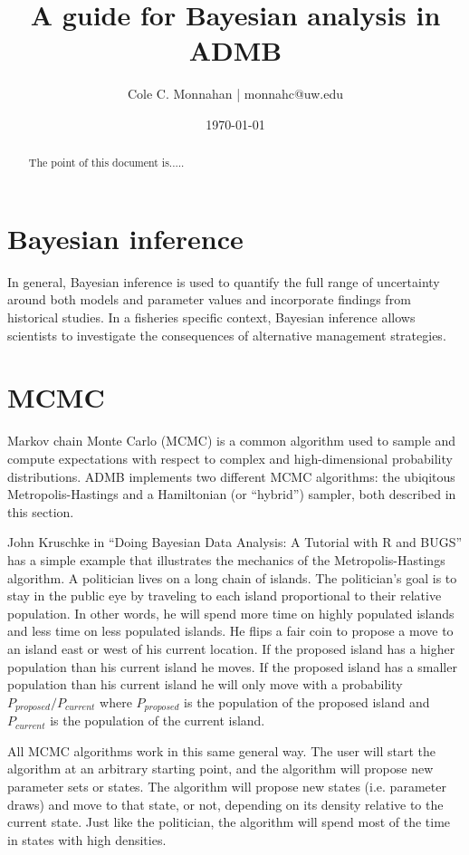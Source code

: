 \documentclass{article}\usepackage[]{graphicx}\usepackage[]{color}
\begin{document}
\title{A guide for Bayesian analysis in ADMB}
\author{Cole C. Monnahan | monnahc@uw.edu}
\date{\today{}}
\maketitle
\begin{abstract}
  The point of this document is.....
\end{abstract}

\tableofcontents

\section{Bayesian inference}
In general, Bayesian inference is used to quantify the full
range of uncertainty around both models and parameter values
and incorporate findings from historical studies. In a
fisheries specific context, Bayesian inference allows
scientists to investigate the consequences of alternative
management strategies.

\section{MCMC}
Markov chain Monte Carlo (MCMC) is a common algorithm used
to sample and compute expectations with respect to complex
and high-dimensional probability distributions.  ADMB
implements two different MCMC algorithms: the ubiqitous
Metropolis-Hastings and a Hamiltonian (or ``hybrid'')
sampler, both described in this section.

John Kruschke in ``Doing Bayesian Data Analysis: A Tutorial
with R and BUGS'' has a simple example that illustrates the
mechanics of the Metropolis-Hastings algorithm. A politician
lives on a long chain of islands. The politician's goal is
to stay in the public eye by traveling to each island
proportional to their relative population. In other words,
he will spend more time on highly populated islands and less
time on less populated islands. He flips a fair coin to
propose a move to an island east or west of his current
location. If the proposed island has a higher population
than his current island he moves. If the proposed island has
a smaller population than his current island he will only
move with a probability $P_{proposed} / P_{current}$ where
$P_{proposed}$ is the population of the proposed island and
$P_{current}$ is the population of the current island.

All MCMC algorithms work in this same general way. The user
will start the algorithm at an arbitrary starting point, and
the algorithm will propose new parameter sets or states. The
algorithm will propose new states (i.e. parameter draws) and
move to that state, or not, depending on its density
relative to the current state. Just like the politician, the
algorithm will spend most of the time in states with high
densities.
\end{document}

